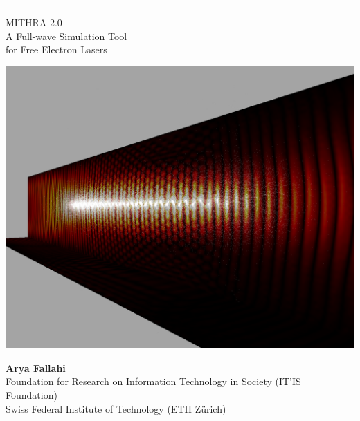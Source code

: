 \documentclass{report}
\begin{document}
\begin{titlepage}
\begin{center}
  \hrule \vspace{3mm}
  {\Huge {MITHRA 2.0} \vspace{10mm} } \\
  {\LARGE {\sc A Full-wave Simulation Tool } \vspace{3mm} } \\
  {\LARGE {for Free Electron Lasers \vspace{3mm} } } \\
\end{center}

\vspace{5mm}


\begin{center}
   \includegraphics[width=180mm]{coverFigure.png}
\end{center}

\vspace{5mm}

\begin{center}
  \Large{ \textbf{Arya Fallahi} } \\
  \Large{ Foundation for Research on Information Technology in Society (IT'IS Foundation)} \\
  \Large{ Swiss Federal Institute of Technology (ETH Z\"urich)} \\
\end{center}

\end{titlepage}
\end{document}

